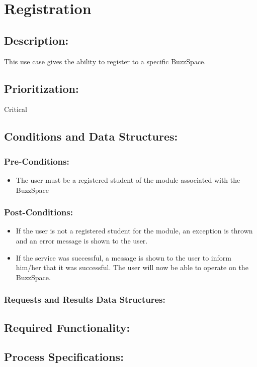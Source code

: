 \documentclass[a4paper,11pt]{article}
\begin{document}
\section{Registration}
\subsection*{Description:}This use case gives the ability to register to a specific BuzzSpace.
\subsection{Prioritization:} Critical
\subsection{Conditions and Data Structures:}
\subsubsection*{Pre-Conditions:}
\begin{itemize}
	\item The user must be a registered student of the module associated with the BuzzSpace
\end{itemize}
\subsubsection*{Post-Conditions:}
\begin{itemize}
	\item If the user is not a registered student for the module, an exception is thrown and an error message is shown to the user.
	\item If the service was successful, a message is shown to the user to inform him/her that it was successful. The user will now be able to operate on the BuzzSpace.
\end{itemize}
\subsubsection*{Requests and Results Data Structures:}
\subsection{Required Functionality:} 
\subsection{Process Specifications:} 
\end{document}
